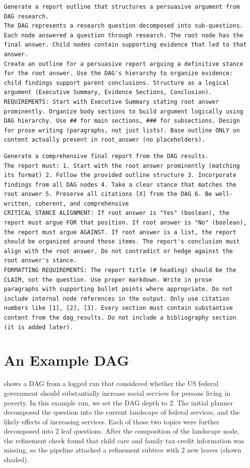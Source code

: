 \begin{lstlisting}[title={OutlineFromDAGSignature (Phase 3)}]
Generate a report outline that structures a persuasive argument from DAG research.
The DAG represents a research question decomposed into sub-questions. Each node answered a question through research. The root node has the final answer. Child nodes contain supporting evidence that led to that answer.
Create an outline for a persuasive report arguing a definitive stance for the root answer. Use the DAG's hierarchy to organize evidence: child findings support parent conclusions. Structure as a logical argument (Executive Summary, Evidence Sections, Conclusion).
REQUIREMENTS: Start with Executive Summary stating root answer prominently. Organize body sections to build argument logically using DAG hierarchy. Use ## for main sections, ### for subsections. Design for prose writing (paragraphs, not just lists). Base outline ONLY on content actually present in root_answer (no placeholders).
\end{lstlisting}

\begin{lstlisting}[title={ReportFromDAGSignature (Phase 3)}]
Generate a comprehensive final report from the DAG results.
The report must: 1. Start with the root answer prominently (matching its format) 2. Follow the provided outline structure 3. Incorporate findings from all DAG nodes 4. Take a clear stance that matches the root answer 5. Preserve all citations [X] from the DAG 6. Be well-written, coherent, and comprehensive
CRITICAL STANCE ALIGNMENT: If root answer is "Yes" (boolean), the report must argue FOR that position. If root answer is "No" (boolean), the report must argue AGAINST. If root answer is a list, the report should be organized around those items. The report's conclusion must align with the root answer. Do not contradict or hedge against the root answer's stance.
FORMATTING REQUIREMENTS: The report title (# heading) should be the CLAIM, not the question. Use proper markdown. Write in prose paragraphs with supporting bullet points where appropriate. Do not include internal node references in the output. Only use citation numbers like [1], [2], [3]. Every section must contain substantive content from the dag_results. Do not include a bibliography section (it is added later).
\end{lstlisting}

\section{An Example DAG}
\label{app:dag}
 shows a DAG from a logged run that considered whether the US federal government should substantially increase social services for persons living in poverty. In this example run, we set the DAG depth to 2. The initial planner decomposed the question into the current landscape of federal services, and the likely effects of increasing services. Each of those two topics were further decomposed into 2 leaf questions. After the composition of the landscape node, the refinement check found that child care and family tax credit information was missing, so the pipeline attached a refinement subtree with 2 new leaves (shown shaded).

